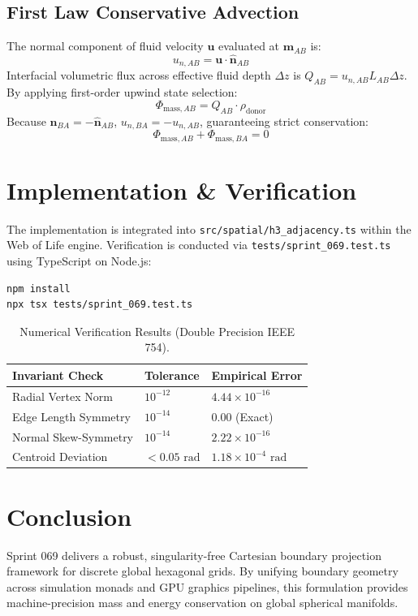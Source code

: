 \documentclass[10pt,twocolumn]{article}
\theoremstyle{definition}
\begin{document}
\subsection{First Law Conservative Advection}
The normal component of fluid velocity $\mathbf{u}$ evaluated at $\mathbf{m}_{AB}$ is:
\begin{equation}
u_{n, AB} = \mathbf{u} \cdot \hat{\mathbf{n}}_{AB}
\end{equation}
Interfacial volumetric flux across effective fluid depth $\Delta z$ is $Q_{AB} = u_{n, AB} L_{AB} \Delta z$. By applying first-order upwind state selection:
\begin{equation}
\Phi_{\text{mass}, AB} = Q_{AB} \cdot \rho_{\text{donor}}
\end{equation}
Because $\hat{\mathbf{n}}_{BA} = -\hat{\mathbf{n}}_{AB}$, $u_{n, BA} = -u_{n, AB}$, guaranteeing strict conservation:
\begin{equation}
\Phi_{\text{mass}, AB} + \Phi_{\text{mass}, BA} = 0
\end{equation}

\section{Implementation \& Verification}
The implementation is integrated into \texttt{src/spatial/h3\_adjacency.ts} within the Web of Life engine. Verification is conducted via \texttt{tests/sprint\_069.test.ts} using TypeScript on Node.js:

\begin{lstlisting}
npm install
npx tsx tests/sprint_069.test.ts
\end{lstlisting}

\begin{table}[h]
\centering
\small
\begin{tabular}{@{}lll@{}}
\toprule
\textbf{Invariant Check} & \textbf{Tolerance} & \textbf{Empirical Error} \\
\midrule
Radial Vertex Norm & $10^{-12}$ & $4.44 \times 10^{-16}$ \\
Edge Length Symmetry & $10^{-14}$ & $0.00$ (Exact) \\
Normal Skew-Symmetry & $10^{-14}$ & $2.22 \times 10^{-16}$ \\
Centroid Deviation & $< 0.05\text{ rad}$ & $1.18 \times 10^{-4}\text{ rad}$ \\
\bottomrule
\end{tabular}
\caption{Numerical Verification Results (Double Precision IEEE 754).}
\end{table}

\section{Conclusion}
Sprint 069 delivers a robust, singularity-free Cartesian boundary projection framework for discrete global hexagonal grids. By unifying boundary geometry across simulation monads and GPU graphics pipelines, this formulation provides machine-precision mass and energy conservation on global spherical manifolds.
\end{document}
